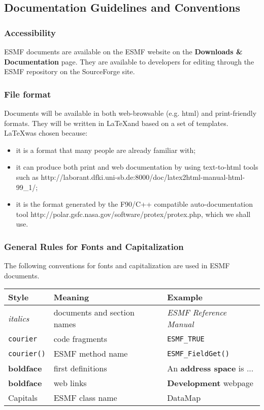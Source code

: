 \subsection{Documentation Guidelines and Conventions}
\label{sec:docguidelines}

\subsubsection{Accessibility}

ESMF documents are available on the ESMF website on the
{\bf Downloads \& Documentation} page.  They are available
to developers for editing through the ESMF repository on the SourceForge site.

\subsubsection{File format}

Documents will be available in both web-browsable (e.g. html) and
print-friendly formats.  They will be written in \LaTeX and based on a
set of templates. \LaTeX was chosen because:

\begin{itemize}
\item it is a format that many people are already familiar with; 
\item it can produce both print and web documentation by using text-to-html
tools such as  
{http://laborant.dfki.uni-sb.de:8000/doc/latex2html-manual-html-99\_1/};
\item it is the format generated by the F90/C++ compatible 
auto-documentation tool 
{http://polar.gsfc.nasa.gov/software/protex/protex.php}\cite{protex}, 
which we shall use.
\end{itemize}

\subsubsection{General Rules for Fonts and Capitalization}

The following conventions for fonts and capitalization are used
in ESMF documents. \newline

\begin{tabular}{lll}
{\bf Style} & {\bf Meaning} & {\bf Example} \\ \hline
{\it italics}  & documents and section names & {\it ESMF Reference Manual}\\
{\tt courier}  & code fragments & {\tt ESMF\_TRUE}\\
{\tt courier()}  & ESMF method name & {\tt ESMF\_FieldGet()} \\
{\bf boldface} & first definitions & An {\bf address space} is ...\\
{\bf boldface} & web links & {\bf Development} webpage \\
{Capitals}     & ESMF class name & DataMap \\
\end{tabular} 
 
